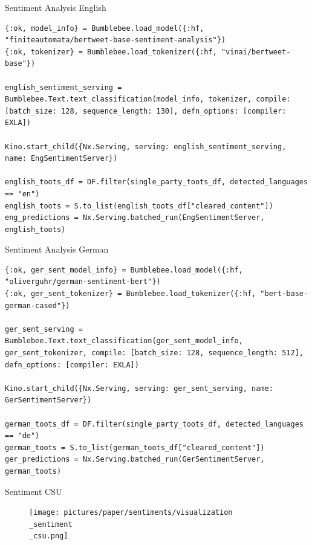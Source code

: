 \begin{frame}[fragile]{Sentiment Analysis English~}
\begin{verbatim}
{:ok, model_info} = Bumblebee.load_model({:hf, "finiteautomata/bertweet-base-sentiment-analysis"})
{:ok, tokenizer} = Bumblebee.load_tokenizer({:hf, "vinai/bertweet-base"})

english_sentiment_serving = Bumblebee.Text.text_classification(model_info, tokenizer, compile: [batch_size: 128, sequence_length: 130], defn_options: [compiler: EXLA])

Kino.start_child({Nx.Serving, serving: english_sentiment_serving, name: EngSentimentServer})

english_toots_df = DF.filter(single_party_toots_df, detected_languages == "en")
english_toots = S.to_list(english_toots_df["cleared_content"])
eng_predictions = Nx.Serving.batched_run(EngSentimentServer, english_toots)
\end{verbatim}
\end{frame}

\begin{frame}{Sentiment Analysis German~}
\begin{verbatim}
{:ok, ger_sent_model_info} = Bumblebee.load_model({:hf, "oliverguhr/german-sentiment-bert"})
{:ok, ger_sent_tokenizer} = Bumblebee.load_tokenizer({:hf, "bert-base-german-cased"})

ger_sent_serving = Bumblebee.Text.text_classification(ger_sent_model_info, ger_sent_tokenizer, compile: [batch_size: 128, sequence_length: 512], defn_options: [compiler: EXLA])

Kino.start_child({Nx.Serving, serving: ger_sent_serving, name: GerSentimentServer})

german_toots_df = DF.filter(single_party_toots_df, detected_languages == "de")
german_toots = S.to_list(german_toots_df["cleared_content"])
ger_predictions = Nx.Serving.batched_run(GerSentimentServer, german_toots)
\end{verbatim}
\end{frame}

\begin{frame}{Sentiment CSU}
	\begin{figure}[htbp]
		\centering
		\texttt{[image: pictures/paper/sentiments/visualization\\\_sentiment\\\_csu.png]}
	\end{figure}
\end{frame}



